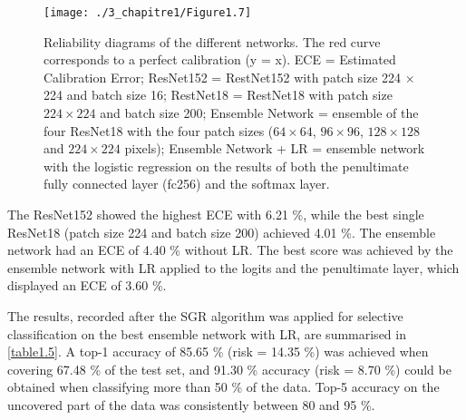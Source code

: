 \begin{figure}[H]
	\begin{center}
	\texttt{[image: ./3\_chapitre1/Figure1.7]}
		\caption[Reliability diagrams of the different networks]{Reliability diagrams of the different networks. The red curve corresponds to a perfect calibration (y = x). ECE = Estimated Calibration Error; ResNet152 = RestNet152 with patch size 224 × 224 and batch size 16; RestNet18 = RestNet18 with patch size \(224 \times 224\) and batch size 200; Ensemble Network = ensemble of the four ResNet18 with the four patch sizes (\(64 \times 64\), \(96 \times 96\), \(128 \times 128\) and \(224 \times 224\) pixels); Ensemble Network + LR = ensemble network with the logistic regression on the results of both the penultimate fully connected layer (fc256) and the softmax layer.}
	\label{figure1.7}
\end{center}
\end{figure}

The ResNet152 showed the highest ECE with 6.21 \%, while the best single ResNet18 (patch size 224 and batch size 200) achieved 4.01 \%. The ensemble network had an ECE of 4.40 \% without LR. The best score was achieved by the ensemble network with LR applied to the logits and the penultimate layer, which displayed an ECE of 3.60 \%.

\medskip

The results, recorded after the SGR algorithm was applied for selective classification on the best ensemble network with LR, are summarised in \autoref{table1.5}. A top-1 accuracy of 85.65 \% (risk = 14.35 \%) was achieved when covering 67.48 \% of the test set, and 91.30 \% accuracy (risk = 8.70 \%) could be obtained when classifying more than 50 \% of the data. Top-5 accuracy on the uncovered part of the data was consistently between 80 and 95 \%.

